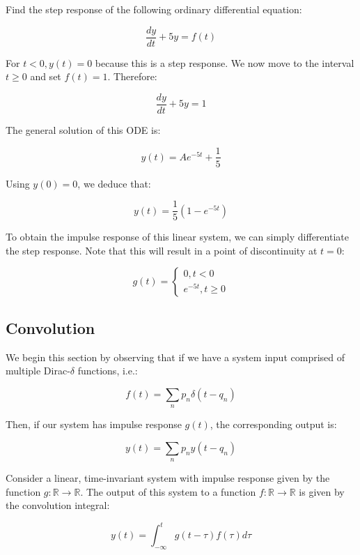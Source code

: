 \documentclass[12pt]{article}
\begin{document}
\begin{example}
    Find the step response of the following ordinary differential equation:

    \[ \frac{dy}{dt} + 5y = f(t) \]

    For $t < 0, y(t) = 0$ because this is a step response. We now move to the interval $t \geq 0$ and set $f(t) = 1$. Therefore:

    \[ \frac{dy}{dt} + 5y = 1 \]

    The general solution of this ODE is:

    \[ y(t) = Ae^{-5t} + \frac{1}{5} \]

    Using $y(0) = 0$, we deduce that:

    \[ y(t) = \frac{1}{5}\left(1 - e^{-5t}\right) \]

    To obtain the impulse response of this linear system, we can simply differentiate the step response. Note that this will result in a point of discontinuity at $t = 0$:

    \[ g(t) = \begin{cases}
        0, t < 0 \\
        e^{-5t}, t \geq 0
    \end{cases} \]
\end{example}

\newpage

\subsection{Convolution}

We begin this section by observing that if we have a system input comprised of multiple Dirac-$\delta$ functions, i.e.:

\[ f(t) = \sum_n p_n\delta(t - q_n) \]

Then, if our system has impulse response $g(t)$, the corresponding output is:

\[ y(t) = \sum_n p_ny(t - q_n) \]

\begin{theorem}
    Consider a linear, time-invariant system with impulse response given by the function $g : \mathbb{R} \to \mathbb{R}$. The output of this system to a function $f : \mathbb{R} \to \mathbb{R}$ is given by the convolution integral:

    \[ y(t) = \int_{-\infty}^t g(t - \tau)f(\tau)d\tau \]
\end{theorem}
\end{document}
